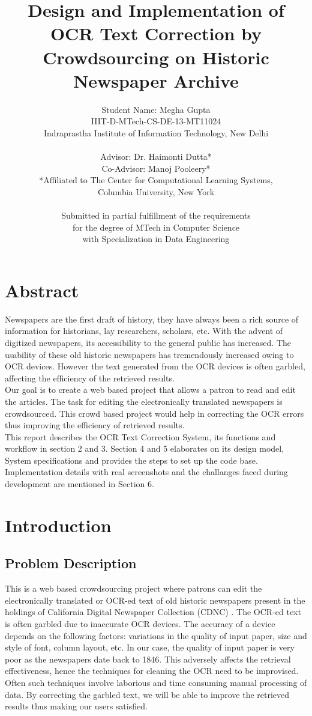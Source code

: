 \documentclass[amsart, 12pt]{article}
\title{Design and Implementation of OCR Text Correction by Crowdsourcing on Historic Newspaper Archive}
\author{Student Name: Megha Gupta\\
IIIT-D-MTech-CS-DE-13-MT11024\\
Indraprastha Institute of Information Technology,
New Delhi\\
\\
Advisor: Dr. Haimonti Dutta* \\
Co-Advisor: Manoj Pooleery* \\
*Affiliated to The Center for Computational Learning Systems,\\
Columbia University, New York\\
\\
Submitted in partial fulfillment of the requirements\\
for the degree of MTech in Computer Science\\
with Specialization in Data Engineering\\}
\begin{document}
\maketitle
\newpage
\section{Abstract}
Newspapers are the first draft of history, they have always been a rich source of information for historians, lay researchers, scholars, etc. With the advent of digitized newspapers, its accessibility to the general public has increased. 
The usability of these old historic newspapers has tremendously increased owing to OCR devices. However the text generated from the OCR devices is often garbled, affecting the efficiency of the retrieved results.\\
Our goal is to create a web based project that allows a patron to read and edit the articles. The task for editing the electronically translated newspapers is crowdsourced. This crowd based project would help in correcting the OCR errors thus improving the efficiency of retrieved results.\\
This report describes the OCR Text Correction System, its functions and workflow in section 2 and 3. Section 4 and 5 elaborates on its design model, System specifications and provides the steps to set up the code base. Implementation details with real screenshots and the challanges faced during development are mentioned in Section 6.

\newpage
\tableofcontents

\newpage
\section{Introduction}

\subsection{Problem Description}
This is a web based crowdsourcing project where patrons can edit the electronically translated or OCR-ed text of old historic newspapers present in the holdings of California Digital Newspaper Collection (CDNC) \cite{cdnc}. The OCR-ed text is often garbled due to inaccurate OCR devices. The accuracy of a device depends on the following factors: variations in the quality of input paper, size and style of font, column layout, etc. In our case, the quality of input paper is very poor as the newspapers date back to 1846. This adversely affects the retrieval effectiveness, hence the techniques for cleaning the OCR \cite{OCR} need to be improvised. Often such techniques involve laborious and time consuming manual processing of data. By correcting the garbled text, we will be able to improve the retrieved results thus making our users satisfied. \\
\end{document}

